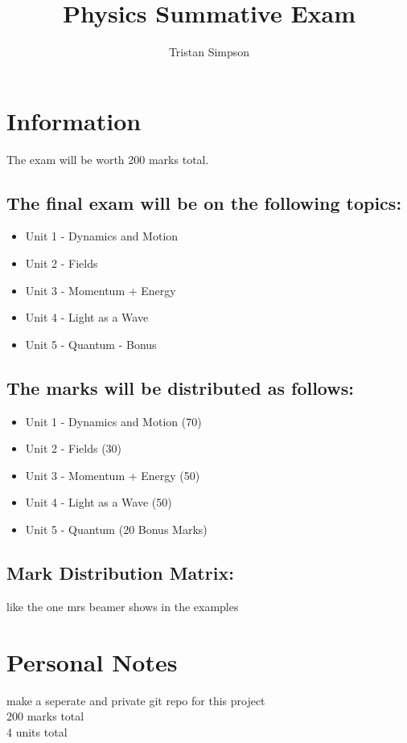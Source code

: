 \documentclass{article}
\title{Physics Summative Exam}
\author{Tristan Simpson}
\begin{document}
\maketitle
\tableofcontents

\section{Information}
The exam will be worth 200 marks total.
\subsection*{The final exam will be on the following topics:}
\begin{itemize}
    \item Unit 1 - Dynamics and Motion
    \item Unit 2 - Fields
    \item Unit 3 - Momentum + Energy
    \item Unit 4 - Light as a Wave
    \item Unit 5 - Quantum - Bonus
\end{itemize}
\subsection*{The marks will be distributed as follows:}
\begin{itemize}
    \item Unit 1 - Dynamics and Motion (70)
    \item Unit 2 - Fields (30)
    \item Unit 3 - Momentum + Energy (50)
    \item Unit 4 - Light as a Wave (50)
    \item Unit 5 - Quantum (20 Bonus Marks)
\end{itemize}
\subsection*{Mark Distribution Matrix:}
like the one mrs beamer shows in the examples



\section{Personal Notes}
make a seperate and private git repo for this project \\
200 marks total \\
4 units total
\end{document}
